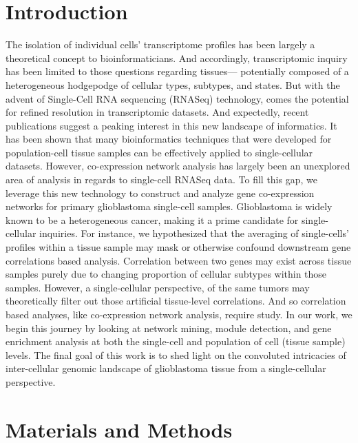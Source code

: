\documentclass[10pt,letterpaper]{article}
\begin{document}
\section*{Introduction}
The isolation of individual cells’ transcriptome profiles has been largely a theoretical concept to bioinformaticians. And accordingly, transcriptomic inquiry has been limited to those questions regarding tissues— potentially composed of a heterogeneous hodgepodge of cellular types, subtypes, and states. But with the advent of Single-Cell RNA sequencing (RNASeq) technology, comes the potential for refined resolution in transcriptomic datasets. And expectedly, recent publications suggest a peaking interest in this new landscape of informatics. It has been shown that many bioinformatics techniques that were developed for population-cell tissue samples can be effectively applied to single-cellular datasets. %
However, co-expression network analysis has largely been an unexplored area of analysis in regards to single-cell RNASeq data. To fill this gap, we leverage this new technology to construct and analyze gene co-expression networks for primary glioblastoma single-cell samples. Glioblastoma is widely known to be a heterogeneous cancer, making it a prime candidate for single-cellular inquiries. For instance, we hypothesized that the averaging of single-cells’ profiles within a tissue sample may mask or otherwise confound downstream gene correlations based analysis. Correlation between two genes may exist across tissue samples purely due to changing proportion of cellular subtypes within those samples. However, a single-cellular perspective, of the same tumors may theoretically filter out those artificial tissue-level correlations. And so correlation based analyses, like co-expression network analysis, require study. In our work, we begin this journey by looking at network mining, module detection, and gene enrichment analysis at both the single-cell and population of cell (tissue sample) levels. The final goal of this work is to shed light on the convoluted intricacies of inter-cellular genomic landscape of glioblastoma tissue from a single-cellular perspective.

\section*{Materials and Methods}
\end{document}
